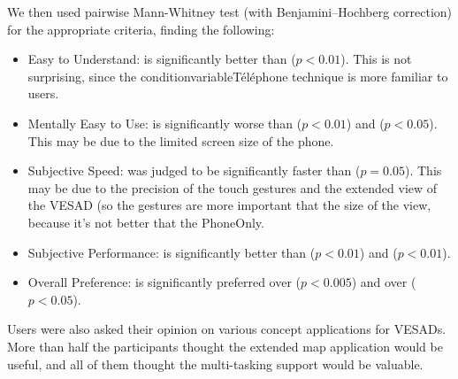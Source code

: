 We then used pairwise Mann-Whitney test (with Benjamini–Hochberg correction) for the appropriate criteria, finding the following:
\begin{itemize}
 \item Easy to Understand:  is significantly better than  ($p<0.01$). This is not surprising, since the conditionvariable{Téléphone} technique is more familiar to users.
 \item Mentally Easy to Use:  is significantly worse than  ($p<0.01$) and  ($p<0.05$). This may be due to the limited screen size of the phone.
 \item Subjective Speed:  was judged to be significantly faster than  ($p=0.05$). This may be due to the precision of the touch gestures and the extended view of the VESAD (so the gestures are more important that the size of the view, because it's not better that the PhoneOnly.
 \item Subjective Performance:  is significantly better than  ($p<0.01$) and  ($p<0.01$).
 \item Overall Preference:  is significantly preferred over  ($p<0.005$) and over  ($p<0.05$). 
\end{itemize}




Users were also asked their opinion on various concept applications for VESADs. More than half the participants thought the extended map application  would be useful, and all of them thought the multi-tasking support  would be valuable.
